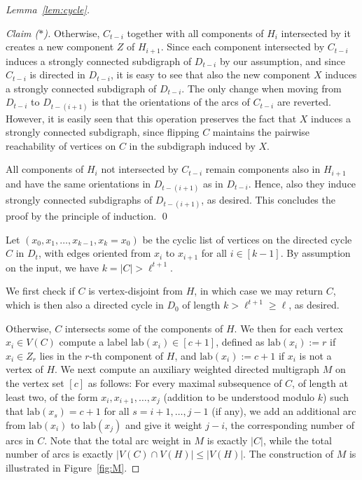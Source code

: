 \documentclass[runningheads]{llncs}
\begin{document}
\begin{proof}[Lemma~\ref{lem:cycle}]
\begin{proof}[Claim ($\ast$)]
Otherwise, $C_{t-i}$ together with all components of $H_i$ intersected by it creates a new component $Z$ of $H_{i+1}$. Since each component intersected by $C_{t-i}$ induces a strongly connected subdigraph of $D_{t-i}$ by our assumption, and since $C_{t-i}$ is directed in $D_{t-i}$, it is easy to see that also the new component $X$ induces a strongly connected subdigraph of $D_{t-i}$. The only change when moving from $D_{t-i}$ to $D_{t-(i+1)}$ is that the orientations of the arcs of $C_{t-i}$ are reverted. However, it is easily seen that this operation preserves the fact that $X$ induces a strongly connected subdigraph, since flipping $C$ maintains the pairwise reachability of vertices on $C$ in the subdigraph induced by $X$. 

All components of $H_i$ not intersected by $C_{t-i}$ remain components also in $H_{i+1}$ and have the same orientations in $D_{t-(i+1)}$ as in $D_{t-i}$. Hence, also they induce strongly connected subdigraphs of $D_{t-(i+1)}$, as desired. This concludes the proof by the principle of induction. 
\qed\end{proof}

Let $(x_0,x_1,\ldots,x_{k-1},x_k=x_0)$ be the cyclic list of vertices on the directed cycle $C$ in $D_t$, with edges oriented from $x_i$ to $x_{i+1}$ for all $i \in [k-1]$. By assumption on the input, we have $k=|C|>\ell^{t+1}$. 

We first check if $C$ is vertex-disjoint from $H$, in which case we may return $C$, which is then also a directed cycle in $D_0$ of length $k>\ell^{t+1}\geq\ell$, as desired. 

Otherwise, $C$ intersects some of the components of $H$. We then for each vertex $x_i \in V(C)$ compute a label $\text{lab}(x_i) \in [c+1]$, defined as $\text{lab}(x_i):=r$ if $x_i \in Z_r$ lies in the $r$-th component of $H$, and $\text{lab}(x_i):=c+1$ if $x_i$ is not a vertex of $H$. We next compute an auxiliary weighted directed multigraph $M$ on the vertex set $[c]$ as follows: For every maximal subsequence of $C$, of length at least two, of the form $x_i,x_{i+1},\ldots, x_j$ (addition to be understood modulo $k$) such that $\text{lab}(x_s)=c+1$ for all $s=i+1,\ldots,j-1$ (if any), we add an additional arc from $\text{lab}(x_i)$ to $\text{lab}(x_j)$ and give it weight $j-i$, the corresponding number of arcs in $C$. Note that the total arc weight in $M$ is exactly $|C|$, while the total number of arcs is exactly $|V(C) \cap V(H)| \le |V(H)|$. The construction of $M$ is illustrated in Figure~\ref{fig:M}.


\end{proof}
\end{document}
